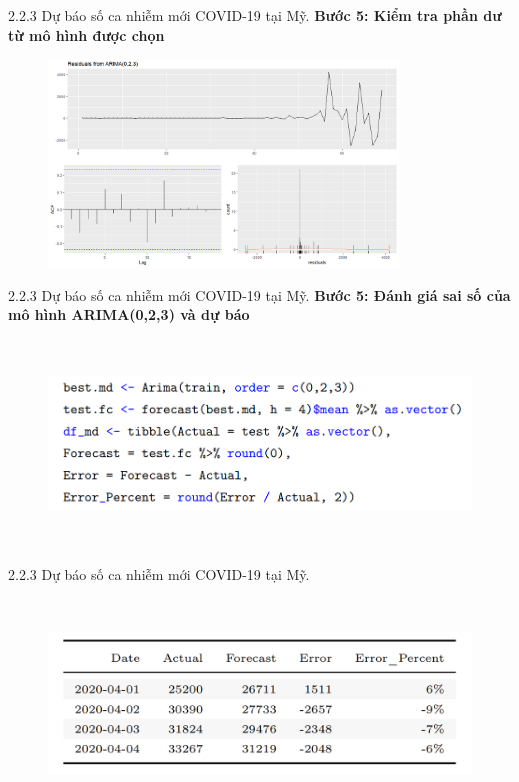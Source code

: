 \documentclass[notheorems,envcountsect,hyperref=unicode]{beamer}
\begin{document}
\begin{frame}{2.2.3 Dự báo số ca nhiễm mới COVID-19 tại Mỹ.}
\textbf{Bước 5: Kiểm tra phần dư từ mô hình được chọn}
	\begin{figure}[!htb]
		\centering
		\includegraphics[width=1\linewidth,height=5.5cm]{NT1} 
	\end{figure}
\end{frame}

\begin{frame}{2.2.3 Dự báo số ca nhiễm mới COVID-19 tại Mỹ.}
	\textbf{Bước 5: Đánh giá sai số của mô hình ARIMA(0,2,3) và dự báo}
	\begin{figure}[!htb]
		\centering
		\includegraphics[width=1\linewidth,height=5.5cm]{duong1} 
	\end{figure}
\end{frame}

\begin{frame}{2.2.3 Dự báo số ca nhiễm mới COVID-19 tại Mỹ.}
	\begin{figure}[!htb]
		\centering
		\includegraphics[width=1\linewidth,height=5.5cm]{duong2} 
	\end{figure}
\end{frame}
\end{document}
